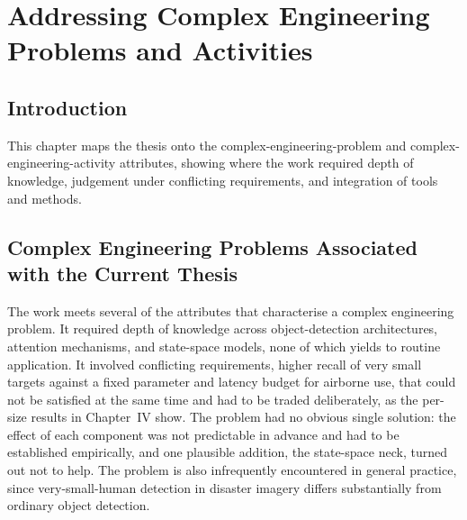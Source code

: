 \chapter{Addressing Complex Engineering Problems and Activities}

\section{Introduction}
This chapter maps the thesis onto the complex-engineering-problem and
complex-engineering-activity attributes, showing where the work required depth of
knowledge, judgement under conflicting requirements, and integration of tools and
methods.

\section{Complex Engineering Problems Associated with the Current Thesis}
The work meets several of the attributes that characterise a complex engineering
problem. It required depth of knowledge across object-detection architectures,
attention mechanisms, and state-space models, none of which yields to routine
application. It involved conflicting requirements, higher recall of very small
targets against a fixed parameter and latency budget for airborne use, that
could not be satisfied at the same time and had to be traded deliberately, as the
per-size results in Chapter~IV show. The problem had no obvious single solution:
the effect of each component was not predictable in advance and had to be
established empirically, and one plausible addition, the state-space neck, turned
out not to help. The problem is also infrequently encountered in general practice,
since very-small-human detection in disaster imagery differs substantially from
ordinary object detection.

